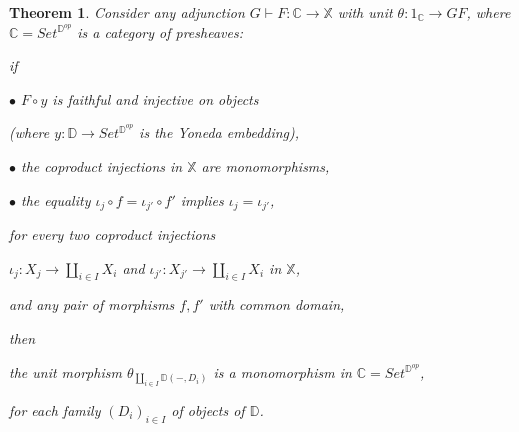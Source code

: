 \documentclass[12pt,a4paper]{amsart}
\newtheorem{theorem}{Theorem}[section]
\theoremstyle{definition}
\begin{document}
\begin{theorem}\label{theorem:ob(N) generating set for C}
Consider any adjunction $G\vdash F:\mathbb{C}\rightarrow \mathbb{X}$ with unit $\theta:1_\mathbb{C}\rightarrow GF$, where $\mathbb{C}=Set^{\mathbb{D}^{op}}$ is a category of presheaves:\vspace{3pt}

\noindent if\vspace{3pt}

$\bullet$ $F\circ y$ is faithful and injective on objects

(where $y:\mathbb{D}\rightarrow Set^{\mathbb{D}^{op}}$ is the Yoneda embedding),

$\bullet$ the coproduct injections in $\mathbb{X}$ are monomorphisms,

$\bullet$ the equality $\iota_j\circ f=\iota_{j'}\circ f'$ implies $\iota_j=\iota_{j'}$,

 for every two coproduct injections

 $\iota_j:X_j\rightarrow\coprod_{i\in I}X_i$ and $\iota_{j'}:X_{j'}\rightarrow\coprod_{i\in I}X_i$ in $\mathbb{X}$,

 and any pair of morphisms $f,f'$ with common domain,\vspace{3pt}

\noindent then\vspace{3pt}

the unit morphism $\theta_{\coprod_{i\in I}\mathbb{D}(-,D_i)}$ is a monomorphism in $\mathbb{C}=Set^{\mathbb{D}^{op}}$,

for each family $(D_i)_{i\in I}$ of objects of $\mathbb{D}$.\end{theorem}
\end{document}
